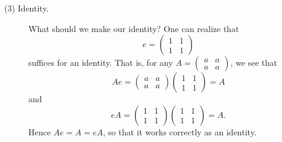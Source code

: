 \begin{description}
        \item[(3) Identity.] What should we make our identity? One can
        realize that 
        \[
            e= \begin{pmatrix}
                1 & 1\\
                1 & 1
            \end{pmatrix}
        \]
        suffices for an identity. That is, for any $A = 
        \begin{pmatrix}
            a & a\\
            a & a
        \end{pmatrix}$, we see that 
        \[
            Ae = 
            \begin{pmatrix}
                a & a\\
                a & a
            \end{pmatrix}
            \begin{pmatrix}
                1 & 1\\
                1 & 1
            \end{pmatrix}
            = A
        \]
        and 
        \[
            eA = 
            \begin{pmatrix}
                1 & 1\\
                1 & 1
            \end{pmatrix}
            \begin{pmatrix}
                1 & 1\\
                1 & 1
            \end{pmatrix}
            = A.
        \]
        Hence $Ae = A = eA$, so that it works correctly as an identity.


\end{description}
